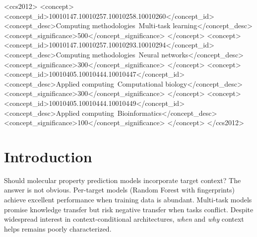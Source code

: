 \documentclass[sigconf]{acmart}
\begin{document}
\begin{CCSXML}
<ccs2012>
<concept>
  <concept_id>10010147.10010257.10010258.10010260</concept_id>
  <concept_desc>Computing methodologies~Multi-task learning</concept_desc>
  <concept_significance>500</concept_significance>
</concept>
<concept>
  <concept_id>10010147.10010257.10010293.10010294</concept_id>
  <concept_desc>Computing methodologies~Neural networks</concept_desc>
  <concept_significance>300</concept_significance>
</concept>
<concept>
  <concept_id>10010405.10010444.10010447</concept_id>
  <concept_desc>Applied computing~Computational biology</concept_desc>
  <concept_significance>300</concept_significance>
</concept>
<concept>
  <concept_id>10010405.10010444.10010449</concept_id>
  <concept_desc>Applied computing~Bioinformatics</concept_desc>
  <concept_significance>100</concept_significance>
</concept>
</ccs2012>
\end{CCSXML}



\maketitle

\section{Introduction}
\label{sec:intro}

Should molecular property prediction models incorporate target context? The answer is not obvious. Per-target models (Random Forest with fingerprints) achieve excellent performance when training data is abundant. Multi-task models promise knowledge transfer but risk negative transfer when tasks conflict. Despite widespread interest in context-conditional architectures, \textit{when} and \textit{why} context helps remains poorly characterized.
\end{document}
